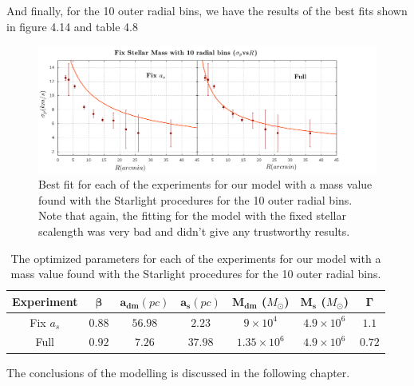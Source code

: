 And finally, for the 10 outer radial bins, we have the results of the best fits shown in figure 4.14 and table 4.8

\begin{figure}[H]
\centering
\includegraphics[width=15cm]{images/Starlight_25_10.png}
\caption[Best fits for our model with a mass value based on the Starlight procedures for the 10 outer radial bins.]{Best fit for each of the experiments for our model with a mass value found with the Starlight procedures for the 10 outer radial bins. Note that again, the fitting for the model with the fixed stellar scalength was very bad and didn't give any trustworthy results.}
\end{figure}

\begin{table}[H]
\begin{center}
\begin{tabular}{| c| c| c| c| c| c| c|}
    \hline
    \textbf{Experiment} & $\mathbf{\beta}$ & $\mathbf{a_{dm}} (pc)$ & $\mathbf{a_{s}} (pc)$ & $\mathbf{M_{dm}}$ ($M_{\odot}$) & $\mathbf{M_{s}}$ ($M_{\odot}$) & $\mathbf{\Gamma}$\\ \hline
	Fix $a_s$ &	$0.88$ &	$56.98$ &	$2.23$ &	$9 \times 10^{4}$ &	$4.9 \times 10 ^{6}$ &	$1.1$\\ \hline
	Full &	$0.92$ &	$7.26$ &	$37.98$ &	$1.35 \times 10^{6}$ &	$4.9 \times 10^{6}$ &	$0.72$\\ \hline
  \end{tabular} 
\caption[Optimized parameters for our model with a mass value based on the Starlight procedures for the 10 outer radial bins.]{The optimized parameters for each of the experiments for our model with a mass value found with the Starlight procedures for the 10 outer radial bins.}
\end{center}  
\end{table}

The conclusions of the modelling is discussed in the following chapter.